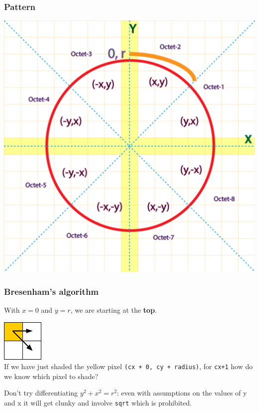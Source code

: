 \documentclass{beamer}
\begin{document}
\begin{frame}
    \frametitle{Pattern}

    \begin{center}
        \includegraphics[scale=0.45]{bresenham-circle.png}
    \end{center}

\end{frame}

\begin{frame}
    \frametitle{Bresenham's algorithm}

    With $x = 0$ and $y = r$, we are starting at the \textbf{top}.

    \begin{tcolorbox}
        \begin{center}
            \includegraphics[scale=0.8]{bresenham-decision.png}\\

            If we have just shaded the yellow pixel \texttt{(cx + 0, cy + radius)}, 
            for \texttt{cx+1} how do we know which pixel to shade?\\
        \end{center}
    \end{tcolorbox}

    \vspace{1em}

    Don't try differentiating $y^2 + x^2 = r^2$: even with assumptions on the values of
    y and x it will get clunky and involve \texttt{sqrt} which is prohibited.

\end{frame}
\end{document}
